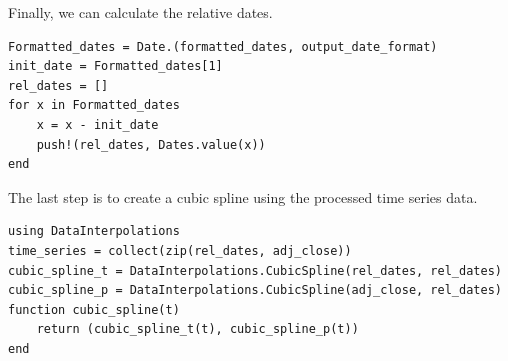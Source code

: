 \documentclass[a4paper,11pt,titlepage]{article}
\theoremstyle{definition}
\theoremstyle{plain}
\theoremstyle{remark}
\begin{document}
Finally, we can calculate the relative dates.
\begin{verbatim}
Formatted_dates = Date.(formatted_dates, output_date_format)
init_date = Formatted_dates[1]
rel_dates = []
for x in Formatted_dates
    x = x - init_date
    push!(rel_dates, Dates.value(x))
end
\end{verbatim}

The last step is to create a cubic spline using the processed time series data.
\begin{verbatim}
using DataInterpolations
time_series = collect(zip(rel_dates, adj_close))
cubic_spline_t = DataInterpolations.CubicSpline(rel_dates, rel_dates)
cubic_spline_p = DataInterpolations.CubicSpline(adj_close, rel_dates)
function cubic_spline(t)
    return (cubic_spline_t(t), cubic_spline_p(t))
end
\end{verbatim}
\pagebreak

\end{document}
